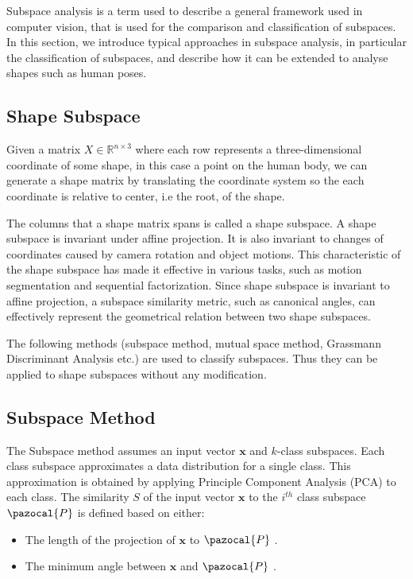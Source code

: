 Subspace analysis is a term used to describe a general framework used in computer vision, that is used for the comparison and classification of subspaces. In this section, we introduce typical approaches in subspace analysis, in particular the classification of subspaces, and describe how it can be extended to analyse shapes such as human poses.

\subsection{Shape Subspace}

Given a matrix $X \in \mathbb{R}^{n \times 3}$ where each row represents a three-dimensional coordinate of some shape, in this case a point on the human body, we can generate a shape matrix by translating the coordinate system so the each coordinate is relative to center, i.e the root, of the shape\cite{Igarashi20113DSubspaces}.  

The columns that a shape matrix spans is called a shape subspace. A shape subspace is invariant under affine projection. It is also invariant to changes of coordinates caused by camera rotation and object motions. This characteristic of the shape subspace has made it effective in various tasks, such as motion segmentation and sequential factorization. Since shape subspace is invariant to affine projection, a subspace similarity metric, such as canonical angles, can effectively represent the geometrical relation between two shape subspaces. 

The following methods (subspace method, mutual space method, Grassmann Discriminant Analysis etc.) are used to classify subspaces. Thus they can be applied to shape subspaces without any modification.

\newpage

\subsection{Subspace Method}

The Subspace method assumes an input vector $\mathbf{x}$ and $k$-class subspaces. Each class subspace approximates a data distribution for a single class. This approximation is obtained by applying Principle Component Analysis (PCA) to each class. The similarity $S$ of the input vector $\mathbf{x}$ to the $i^{th}$ class subspace $\pazocal{P}$ is defined based on either:

\begin{itemize}
    \item The length of the  projection of $\mathbf{x}$ to $\pazocal{P}$ \cite{WATANABE1967EvaluationRecognition}.
    \item The minimum angle between $\mathbf{x}$ and $\pazocal{P}$ \cite{Iijima1973THEORYMETHOD.}.
\end{itemize}

